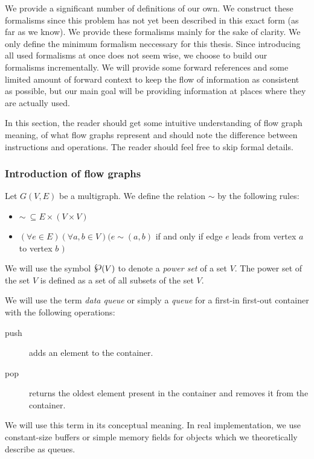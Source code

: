 

We provide a significant number of definitions of our own. We construct these formalisms since this problem has not yet been described in this exact form (as far as we know).  We provide these formalisms mainly for the sake of clarity. We only define the minimum formalism neccessary for this thesis. Since introducing all used formalisms at once does not seem wise, we choose to build our formalisms incrementally. We will provide some forward references and some limited amount of forward context to keep the flow of information as consistent as possible, but our main goal will be providing information at places where they are actually used.


In this section, the reader should get some intuitive understanding of flow graph meaning, of what flow graphs represent and should note the difference between instructions and operations. The reader should feel free to skip formal details.

\subsubsection{Introduction of flow graphs}

  Let $G(V,E)$ be a multigraph. We define the relation $\sim$ by the following rules: \begin{itemize}
  \item $\sim \ \subseteq E \times (V \times V)$ 
  \item $ (\forall e \in E)(\forall a,b \in V)( e \sim (a,b) $ if and only if edge $e$ leads from vertex $a$ to vertex $b$ $)$
  \end{itemize}
\myenddef


  We will use the symbol $\powerset(V)$ to denote a \emph{power set} of a set $V$. The power set of the set $V$ is defined as a set of all subsets of the set $V$.
\myenddef


  We will use the term \emph{data queue} or simply a \emph{queue} for a first-in first-out container with the following operations:
  \begin{description}
  \item[push] adds an element to the container.
  \item[pop] returns the oldest element present in the container and removes it from the container.
  \end{description}
  We will use this term in its conceptual meaning. In real implementation, we use constant-size buffers or simple memory fields for objects which we theoretically describe as queues.
\myenddef


